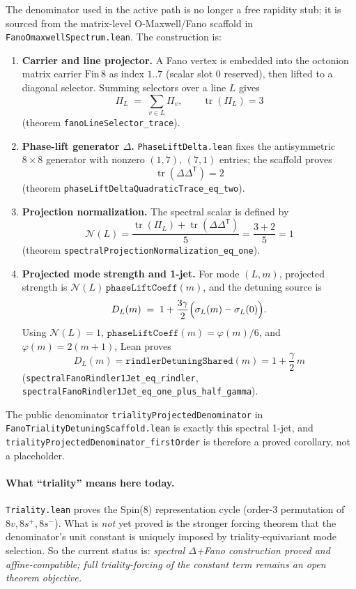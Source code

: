 \documentclass[11pt]{article}
\begin{document}
The denominator used in the active path is no longer a free rapidity stub; it is sourced from the
matrix-level O-Maxwell/Fano scaffold in \texttt{FanoOmaxwellSpectrum.lean}. The construction is:
\begin{enumerate}
  \item \textbf{Carrier and line projector.} A Fano vertex is embedded into the octonion matrix carrier
  \(\mathrm{Fin}\,8\) as index \(1..7\) (scalar slot \(0\) reserved), then lifted to a diagonal selector.
  Summing selectors over a line \(L\) gives
  \[
    \Pi_L \;=\; \sum_{v\in L}\Pi_v,
    \qquad \operatorname{tr}(\Pi_L)=3
  \]
  (theorem \texttt{fanoLineSelector\_trace}).

  \item \textbf{Phase-lift generator \(\Delta\).} \texttt{PhaseLiftDelta.lean} fixes the antisymmetric
  \(8\times 8\) generator with nonzero \((1,7)\), \((7,1)\) entries; the scaffold proves
  \[
    \operatorname{tr}(\Delta\Delta^{\mathsf T})=2
  \]
  (theorem \texttt{phaseLiftDeltaQuadraticTrace\_eq\_two}).

  \item \textbf{Projection normalization.} The spectral scalar is defined by
  \[
    \mathcal{N}(L)=\frac{\operatorname{tr}(\Pi_L)+\operatorname{tr}(\Delta\Delta^{\mathsf T})}{5}
    =\frac{3+2}{5}=1
  \]
  (theorem \texttt{spectralProjectionNormalization\_eq\_one}).

  \item \textbf{Projected mode strength and 1-jet.} For mode \((L,m)\), projected strength is
  \(\mathcal{N}(L)\,\texttt{phaseLiftCoeff}(m)\), and the detuning source is
  \[
    D_L(m)\;=\;1+\frac{3\gamma}{2}\Bigl(\sigma_L(m)-\sigma_L(0)\Bigr).
  \]
  Using \(\mathcal{N}(L)=1\), \(\texttt{phaseLiftCoeff}(m)=\varphi(m)/6\), and
  \(\varphi(m)=2(m+1)\), Lean proves
  \[
    D_L(m)=\texttt{rindlerDetuningShared}(m)=1+\frac{\gamma}{2}\,m
  \]
  (\texttt{spectralFanoRindler1Jet\_eq\_rindler},
  \texttt{spectralFanoRindler1Jet\_eq\_one\_plus\_half\_gamma}).
\end{enumerate}

The public denominator \texttt{trialityProjectedDenominator} in
\texttt{FanoTrialityDetuningScaffold.lean} is exactly this spectral 1-jet, and
\texttt{trialityProjectedDenominator\_firstOrder} is therefore a proved corollary, not a placeholder.

\paragraph{What ``triality'' means here today.}
\texttt{Triality.lean} proves the Spin(8) representation cycle (order-3 permutation of \(8v,8s^+,8s^-\)).
What is \emph{not} yet proved is the stronger forcing theorem that the denominator's unit constant is
uniquely imposed by triality-equivariant mode selection. So the current status is:
\emph{spectral \(\Delta\)+Fano construction proved and affine-compatible; full triality-forcing of the
constant term remains an open theorem objective.}
\end{document}
